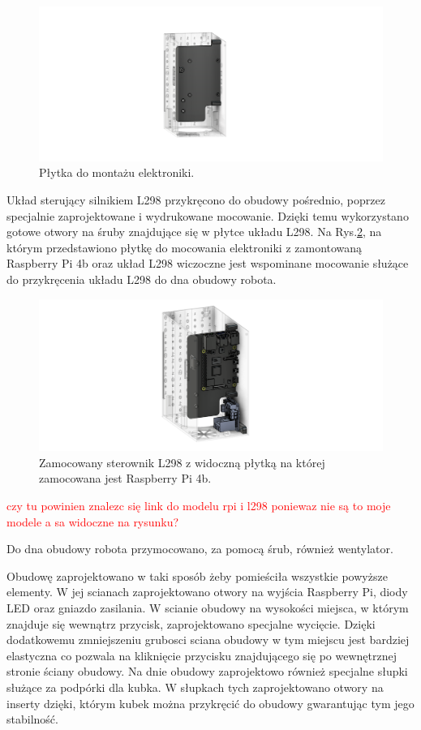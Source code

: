 \begin{figure}[H]
    \centering
    \includegraphics[width=0.95\linewidth]{chapters/03-praca-wlasna/figures/main_board.png}
    \caption{\label{fig:mainboard}Płytka do montażu elektroniki.}
\end{figure}

Układ sterujący silnikiem L298 przykręcono do obudowy pośrednio, poprzez specjalnie zaprojektowane i wydrukowane mocowanie. Dzięki temu wykorzystano
gotowe otwory na śruby znajdujące się w płytce układu L298. Na Rys.\ref{fig:steownik}, na którym przedstawiono płytkę do mocowania elektroniki
z zamontowaną Raspberry Pi 4b oraz układ L298 wiczoczne jest wspominane mocowanie służące do przykręcenia układu L298 do dna obudowy robota.

\begin{figure}[H]
    \centering
    \includegraphics[width=0.95\linewidth]{chapters/03-praca-wlasna/figures/l298n.png}
    \caption{\label{fig:steownik}Zamocowany sterownik L298 z widoczną płytką na której zamocowana jest Raspberry Pi 4b.}
\end{figure}
\textcolor{red}{czy tu powinien znalezc się link do modelu rpi i l298 poniewaz nie są to moje modele a sa widoczne na rysunku?}

Do dna obudowy robota przymocowano, za pomocą śrub, również wentylator.

Obudowę zaprojektowano w taki sposób żeby pomieściła wszystkie powyższe elementy. W jej scianach zaprojektowano otwory na wyjścia Raspberry Pi, 
diody LED oraz gniazdo zasilania. W scianie obudowy na wysokości miejsca, w którym znajduje się wewnątrz przycisk, zaprojektowano specjalne wycięcie.
Dzięki dodatkowemu zmniejszeniu grubosci sciana obudowy w tym miejscu jest bardziej elastyczna co pozwala na kliknięcie przycisku znajdującego
się po wewnętrznej stronie ściany obudowy. Na dnie obudowy zaprojektowo również specjalne słupki służące za podpórki dla kubka. 
W słupkach tych zaprojektowano otwory na inserty dzięki, którym kubek można przykręcić do obudowy gwarantując tym jego stabilność.

